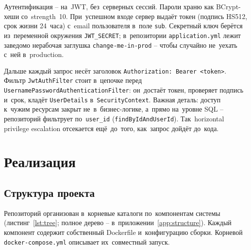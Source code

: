 \documentclass[a4paper,12pt]{diplom}
\begin{document}
Аутентификация -- на~JWT, без~серверных сессий. Пароли храню как BCrypt-хеши со~strength~10. При~успешном входе сервер выдаёт токен (подпись HS512, срок жизни 24~часа) с~email пользователя в~поле \texttt{sub}. Секретный ключ берётся из~переменной окружения \verb|JWT_SECRET|; в~репозитории \texttt{application.yml} лежит заведомо нерабочая заглушка \verb|change-me-in-prod| -- чтобы случайно не~уехать с~ней в~production.

Дальше каждый запрос несёт заголовок \verb|Authorization: Bearer <token>|. Фильтр \texttt{JwtAuthFilter} стоит в~цепочке перед \texttt{UsernamePasswordAuthenticationFilter}: он~достаёт токен, проверяет подпись и~срок, кладёт \texttt{UserDetails} в~\texttt{SecurityContext}. Важная деталь: доступ к~чужим ресурсам закрыт не~в~бизнес-логике, а~прямо на~уровне SQL -- репозиторий фильтрует по~\verb|user_id| (\verb|findByIdAndUserId|). Так~horizontal privilege escalation отсекается ещё~до~того, как~запрос дойдёт до~кода.

\chapter{Реализация}
\label{ch:implementation}

\section{Структура проекта}
\label{sec:structure}

Репозиторий организован в~корневые каталоги по~компонентам системы (листинг~\ref{lst:tree}; полное дерево -- в~приложении~\ref{app:structure}). Каждый компонент содержит собственный Dockerfile и~конфигурацию сборки. Корневой \verb|docker-compose.yml| описывает их~совместный запуск.
\end{document}
